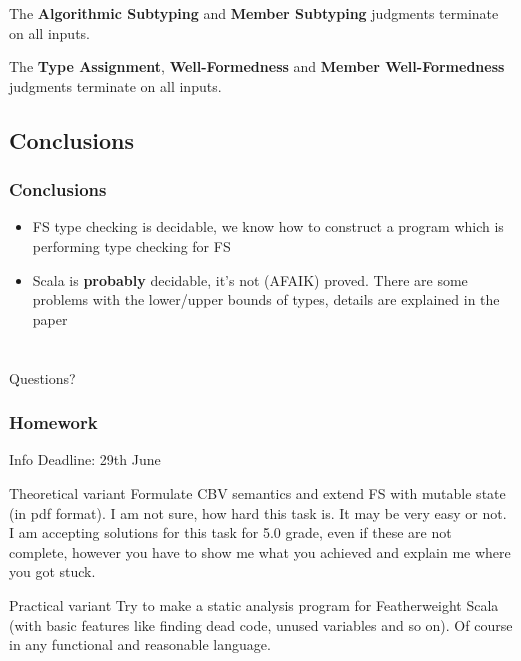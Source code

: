 \documentclass[aspectratio=169]{beamer}
\begin{document}
\begin{frame}
\begin{lemma}
 The \textbf{Algorithmic Subtyping} and \textbf{Member Subtyping} judgments terminate on all inputs.
\end{lemma}
\begin{lemma}
The \textbf{Type Assignment}, \textbf{Well-Formedness} and \textbf{Member Well-Formedness} judgments terminate on all inputs.
\end{lemma}
\end{frame}

\subsection{Conclusions}

\begin{frame}
\frametitle{Conclusions}
\begin{itemize}
 \item FS type checking is decidable, we know how to construct a program which is performing type checking for FS
 \item Scala is \textbf{probably} decidable, it's not (AFAIK) proved. There are some problems with the lower/upper bounds of types, details are explained in the paper
\end{itemize}

\end{frame}

\section{}
\subsection{}

\begin{frame}
\begin{center}
\Huge{Questions?}
\end{center}
\end{frame}

\begin{frame}
\frametitle{Homework}
\begin{block}{Info}
 Deadline: 29th June
\end{block}
\begin{block}{Theoretical variant}
  Formulate CBV semantics and extend FS with mutable state (in pdf format).
  I am not sure, how hard this task is. It may be very easy or not.
  I am accepting solutions for this task for 5.0 grade, even if these are not complete,
  however you have to show me what you achieved and explain me where you got stuck.
\end{block}
\begin{block}{Practical variant}
  Try to make a static analysis program for Featherweight Scala (with basic features like finding dead code, unused variables and so on). Of course in any functional and reasonable language.
\end{block}
\end{frame}
\end{document}
